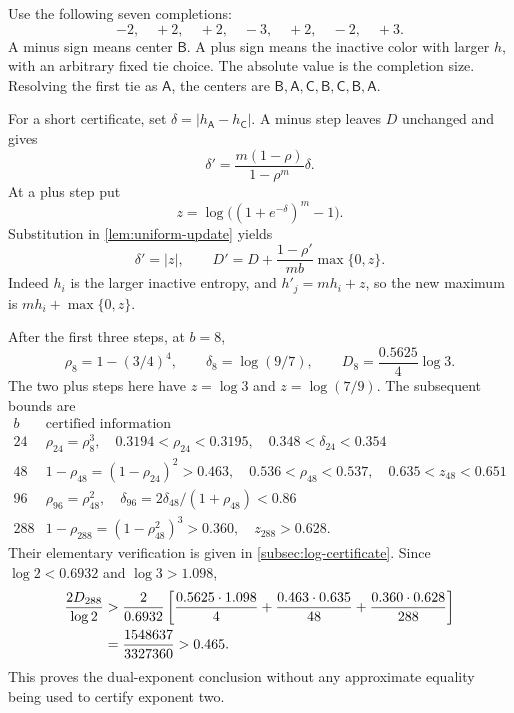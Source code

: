 \documentclass[11pt]{article}
\numberwithin{equation}{section}
\theoremstyle{definition}
\theoremstyle{remark}
\begin{document}
Use the following seven completions:
\begin{equation}\label{eq:dual-script}
 -2,\quad +2,\quad +2,\quad -3,\quad +2,\quad -2,\quad +3.
\end{equation}
A minus sign means center \(\mathsf B\).
A plus sign means the inactive color with larger \(h\), with an
arbitrary fixed tie choice.
The absolute value is the completion size.
Resolving the first tie as \(\mathsf A\), the centers are
\(\mathsf B,\mathsf A,\mathsf C,\mathsf B,\mathsf C,\mathsf B,\mathsf A\).

For a short certificate, set
\(\delta=|h_{\mathsf A}-h_{\mathsf C}|\).
A minus step leaves \(D\) unchanged and gives
\[
 \delta'=\frac{m(1-\rho)}{1-\rho^m}\delta.
\]
At a plus step put
\[
 z=\log\bigl((1+e^{-\delta})^m-1\bigr).
\]
Substitution in \cref{lem:uniform-update} yields
\begin{equation}\label{eq:delta-D}
 \delta'=|z|,\qquad
 D'=D+\frac{1-\rho'}{mb}\max\{0,z\}.
\end{equation}
Indeed \(h_i\) is the larger inactive entropy, and
\(h'_j=mh_i+z\), so the new maximum is
\(mh_i+\max\{0,z\}\).

After the first three steps, at \(b=8\),
\[
 \rho_8=1-(3/4)^4,\qquad
 \delta_8=\log(9/7),\qquad
 D_8=\frac{0.5625}{4}\log3.
\]
The two plus steps here have \(z=\log3\) and \(z=\log(7/9)\).
The subsequent bounds are
\[
\begin{array}{c|l}
 b&\text{certified information}\\ \hline
24&
 \rho_{24}=\rho_8^3,\quad
 0.3194<\rho_{24}<0.3195,\quad
 0.348<\delta_{24}<0.354\\
48&
 1-\rho_{48}=(1-\rho_{24})^2>0.463,\quad
 0.536<\rho_{48}<0.537,\quad 0.635<z_{48}<0.651\\
96&
 \rho_{96}=\rho_{48}^2,\quad
 \delta_{96}=2\delta_{48}/(1+\rho_{48})<0.86\\
288&
 1-\rho_{288}=(1-\rho_{48}^2)^3>0.360,\quad z_{288}>0.628.
\end{array}
\]
Their elementary verification is given in \cref{subsec:log-certificate}.
Since \(\log2<0.6932\) and \(\log3>1.098\),
\begin{align}
 \frac{2D_{288}}{\log2}
 &>
 \frac{2}{0.6932}
 \left[
  \frac{0.5625\cdot1.098}{4}
  +\frac{0.463\cdot0.635}{48}
  +\frac{0.360\cdot0.628}{288}
 \right]\notag\\
 &=\frac{1548637}{3327360}>0.465. \label{eq:alpha-rational}
\end{align}
This proves the dual-exponent conclusion without any approximate
equality being used to certify exponent two.
\end{document}
